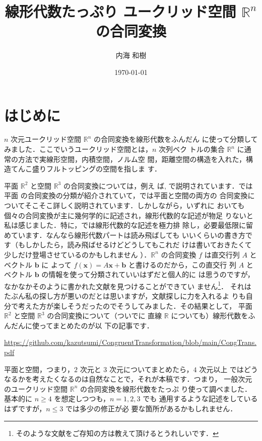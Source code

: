 \documentclass[11pt, uplatex, dvipdfmx, titlepage]{jsarticle}
\theoremstyle{definition}
\begin{document}
\title{線形代数たっぷり ユークリッド空間 $\mathbb{R}^n$ の合同変換}
\author{内海 和樹}
\date{\today}

\maketitle
  


\section*{はじめに}


$n$ 次元ユークリッド空間 $\mathbb{R}^n$ の合同変換を線形代数をふんだん
に使って分類してみました．ここでいうユークリッド空間とは，$n$ 次列ベク
トルの集合 $\mathbb{R}^n$ に通常の方法で実線形空間，内積空間，ノルム空
間，距離空間の構造を入れた，構造てんこ盛りフルトッピングの空間を指しま
す．

平面 $\mathbb{R}^2$ と空間 $\mathbb{R}^3$ の合同変換については，例え
ば\cite{Kawasaki}, \cite{Kouno}で説明されています．\cite{Kouno}では平面
の合同変換の分類が紹介されていて，\cite{Kawasaki}では平面と空間の両方の
合同変換についてそこそこ詳しく説明されています．しかしながら，いずれに
おいても個々の合同変換が主に幾何学的に記述され，線形代数的な記述が物足
りないと私は感じました．特に，\cite{Kouno}では線形代数的な記述を極力排
除し，必要最低限に留めています．なんなら線形代数パートは読み飛ばしても
いいくらいの書き方です（もしかしたら，読み飛ばせるけどどうしてもこれだ
けは書いておきたくて少しだけ登場させているのかもしれません
）．$\mathbb{R}^n$ の合同変換 $f$ は直交行列 $A$ とベクトル $\bm{b}$ に
よって $f(\bm{x}) = A\bm{x} + \bm{b}$ と書けるのだから，この直交行
列 $A$ とベクトル $\bm{b}$ の情報を使って分類されていいはずだと個人的に
は思うのですが，なかなかそのように書かれた文献を見つけることができてい
ません\footnote{そのような文献をご存知の方は教えて頂けるとうれしいです．}．
それはたぶん私の探し方が悪いのだとは思いますが，文献探しに力を入れるよ
りも自分で考えた方が楽しそうだったのでそうしてみました．その結果として，
平面 $\mathbb{R}^2$ と空間 $\mathbb{R}^3$ の合同変換について（ついでに
直線 $\mathbb{R}$ についても）線形代数をふんだんに使ってまとめたのが以
下の記事です．
\begin{center}
  \url{https://github.com/kazutsumi/CongruentTransformation/blob/main/CongTrans.pdf}
\end{center}
平面と空間，つまり，$2$ 次元と $3$ 次元についてまとめたら，$4$ 次元以上
ではどうなるかを考えたくなるのは自然なことで，それが本稿です．つまり，
一般次元のユークリッド空間 $\mathbb{R}^n$ の合同変換を線形代数をたっぷ
り使って調べました．基本的に $n \geq 4$ を想定しつつも，$n=1,2,3$ でも
通用するような記述をしているはずですが，$n \leq 3$ では多少の修正が必
要な箇所があるかもしれません．
\end{document}
